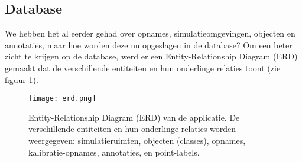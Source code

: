 
\subsection{Database}

We hebben het al eerder gehad over opnames, simulatieomgevingen, objecten en annotaties, maar hoe worden deze nu opgeslagen in de database?
Om een beter zicht te krijgen op de database, werd er een Entity-Relationship Diagram (ERD) gemaakt dat de verschillende entiteiten en hun onderlinge relaties toont (zie figuur \ref{fig:erd}).

\begin{figure}[H]
  \centering
  \texttt{[image: erd.png]}
  \caption[]{\label{fig:erd} Entity-Relationship Diagram (ERD) van de applicatie. De verschillende entiteiten en hun onderlinge relaties worden weergegeven: simulatieruimten, objecten (classes), opnames, kalibratie-opnames, annotaties, en point-labels. }
\end{figure}


